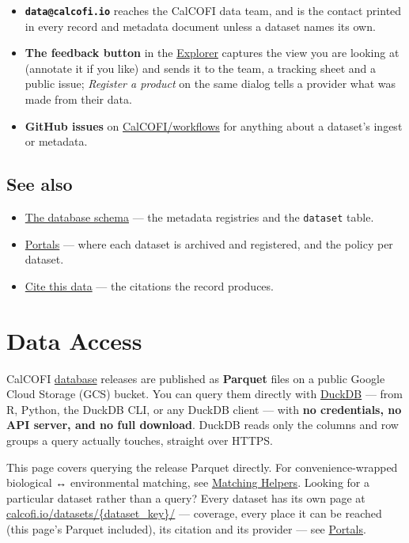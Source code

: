 \documentclass[
  letterpaper,
  DIV=11,
  numbers=noendperiod]{scrreprt}
\providecommand{\tightlist}{%
  \setlength{\itemsep}{0pt}\setlength{\parskip}{0pt}}
\begin{document}
\begin{itemize}
\tightlist
\item
  \textbf{\texttt{data@calcofi.io}} reaches the CalCOFI data team, and
  is the contact printed in every record and metadata document unless a
  dataset names its own.
\item
  \textbf{The feedback button} in the
  \href{https://calcofi.io/explore/}{Explorer} captures the view you are
  looking at (annotate it if you like) and sends it to the team, a
  tracking sheet and a public issue; \emph{Register a product} on the
  same dialog tells a provider what was made from their data.
\item
  \textbf{GitHub issues} on
  \href{https://github.com/CalCOFI/workflows/issues}{CalCOFI/workflows}
  for anything about a dataset's ingest or metadata.
\end{itemize}

\section{See also}\label{see-also}

\begin{itemize}
\tightlist
\item
  \hyperref[database]{The database schema} --- the metadata registries
  and the \texttt{dataset} table.
\item
  \href{portals.qmd}{Portals} --- where each dataset is archived and
  registered, and the policy per dataset.
\item
  \href{cite.qmd}{Cite this data} --- the citations the record produces.
\end{itemize}


\chapter{Data Access}\label{data-access}

CalCOFI \hyperref[database]{database} releases are published as
\textbf{Parquet} files on a public Google Cloud Storage (GCS) bucket.
You can query them directly with \href{https://duckdb.org}{DuckDB} ---
from R, Python, the DuckDB CLI, or any DuckDB client --- with \textbf{no
credentials, no API server, and no full download}. DuckDB reads only the
columns and row groups a query actually touches, straight over HTTPS.

This page covers querying the release Parquet directly. For
convenience-wrapped biological ↔ environmental matching, see
\href{helpers.qmd}{Matching Helpers}. Looking for a particular dataset
rather than a query? Every dataset has its own page at
\href{https://calcofi.io/datasets/}{calcofi.io/datasets/\{dataset\_key\}/}
--- coverage, every place it can be reached (this page's Parquet
included), its citation and its provider --- see
\href{portals.qmd}{Portals}.
\end{document}

